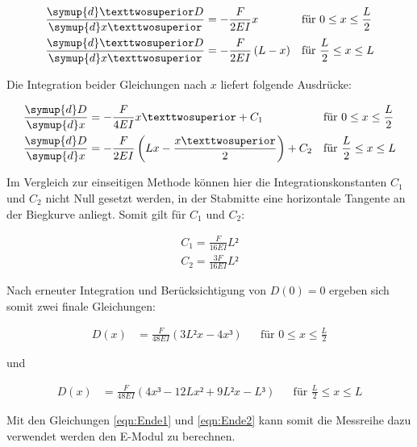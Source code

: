 \begin{align*}
    \frac{\symup{d}²D}{\symup{d}x²} &= -\frac{F}{2EI}x & &\text{für}\,\, 0 \leq x \leq \frac{L}{2}\\
    \frac{\symup{d}²D}{\symup{d}x²} &= -\frac{F}{2EI}\left(L-x\right) & &\text{für}\,\, \frac{L}{2} \leq x \leq L
\end{align*}

\noindent Die Integration beider Gleichungen nach $x$ liefert folgende Ausdrücke:

\begin{align*}
    \frac{\symup{d}D}{\symup{d}x} &= -\frac{F}{4EI}x²+C_1 & &\text{für}\,\, 0 \leq x \leq \frac{L}{2}\\
    \frac{\symup{d}D}{\symup{d}x} &= -\frac{F}{2EI}\left(Lx-\frac{x²}{2}\right)+C_2 & &\text{für}\,\, \frac{L}{2} \leq x \leq L
\end{align*}

\noindent Im Vergleich zur einseitigen Methode können hier die Integrationskonstanten $C_1$ und $C_2$ nicht Null gesetzt werden,
in der Stabmitte eine horizontale Tangente an der Biegkurve anliegt. Somit gilt für $C_1$ und $C_2$:

\begin{gather*}
    C_1 = \frac{F}{16EI}L²\\
    C_2 = \frac{3F}{16EI}L²
\end{gather*}

\noindent Nach erneuter Integration und Berücksichtigung von $D(0) = 0$ ergeben sich somit zwei finale Gleichungen:

\begin{align}
\label{eqn:Ende1}
    D(x) &= \frac{F}{48EI}\left(3L²x-4x³\right) & &\text{für}\,\, 0 \leq x \leq \frac{L}{2}
\end{align}

\noindent und

\begin{align}
\label{eqn:Ende2}
    D(x) &= \frac{F}{48EI}\left(4x³-12Lx²+9L²x-L³\right) & &\text{für}\,\, \frac{L}{2} \leq x \leq L 
\end{align}

\noindent Mit den Gleichungen \eqref{eqn:Ende1} und \eqref{eqn:Ende2} kann somit die Messreihe dazu verwendet werden
den E-Modul zu berechnen.

